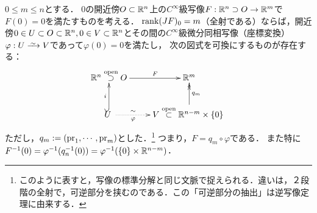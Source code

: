 \documentclass[uplatex,dvipdfmx]{jsreport}
\begin{document}
\begin{theorem}[陰関数定理]
    $0\le m\le n$とする．
    $0$の開近傍$O\subset\mathbb{R}^n$上の$C^\infty$級写像$F:\mathbb{R}^n\supset O\to\mathbb{R}^m$で$F(0)=0$を満たすものを考える．
    $\mathrm{rank}(JF)_0=m$（全射である）ならば，開近傍$0\in U\subset O\subset\mathbb{R}^n,0\in V\subset\mathbb{R}^n$とその間の$C^\infty$級微分同相写像（座標変換）$\varphi:U\iso V$であって$\varphi(0)=0$を満たし，
    次の図式を可換にするものが存在する：
    \[\xymatrix{
        \R^n\osup O\ar[r]^-F&\R^m\\
        U \;\ar@{^{(}->}[u]^-i\ar@{.>}[r]_-{\varphi}^-\sim&V\osub\R^{n-m}\times\{0\} \;\ar@{->>}[u]_-{q_m}
    }\]
    ただし，$q_m:=(\mathrm{pr}_1,\cdots,\mathrm{pr}_m)$とした．\footnote{このように表すと，写像の標準分解と同じ文脈で捉えられる．違いは，２段階の全射で，可逆部分を挟むのである．この「可逆部分の抽出」は逆写像定理に由来する．}
    つまり，$F=q_m\circ\varphi$である．
    また特に$F^{-1}(0)=\varphi^{-1}(q_n^{-1}(0))=\varphi^{-1}(\{0\}\times\mathbb{R}^{n-m})$．
\end{theorem}
\end{document}

